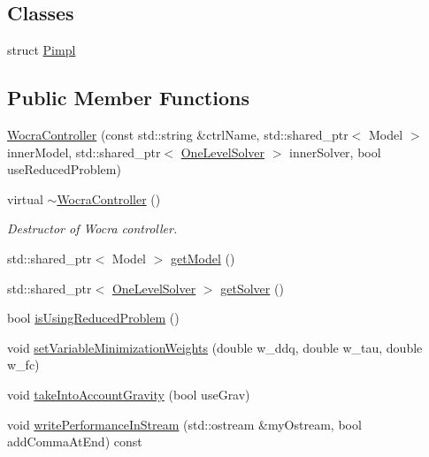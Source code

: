 \subsection*{Classes}
\begin{DoxyCompactItemize}
\item 
struct \hyperlink{structwocra_1_1WocraController_1_1Pimpl}{Pimpl}
\end{DoxyCompactItemize}
\subsection*{Public Member Functions}
\begin{DoxyCompactItemize}
\item 
\hyperlink{classwocra_1_1WocraController_ae14fda387f6d308aead6ab7a59e82e74}{Wocra\+Controller} (const std\+::string \&ctrl\+Name, std\+::shared\+\_\+ptr$<$ Model $>$ inner\+Model, std\+::shared\+\_\+ptr$<$ \hyperlink{classocra_1_1OneLevelSolver}{One\+Level\+Solver} $>$ inner\+Solver, bool use\+Reduced\+Problem)
\item 
virtual \hyperlink{classwocra_1_1WocraController_a4051d9aab485cfa444ed90da795f2bb2}{$\sim$\+Wocra\+Controller} ()
\begin{DoxyCompactList}\small\item\em Destructor of Wocra controller. \end{DoxyCompactList}\item 
std\+::shared\+\_\+ptr$<$ Model $>$ \hyperlink{classwocra_1_1WocraController_adc7f78b5f888c76a3296cfd5882caad1}{get\+Model} ()
\item 
std\+::shared\+\_\+ptr$<$ \hyperlink{classocra_1_1OneLevelSolver}{One\+Level\+Solver} $>$ \hyperlink{classwocra_1_1WocraController_a94f67ee0ae6985969f4f1798bde0a9db}{get\+Solver} ()
\item 
bool \hyperlink{classwocra_1_1WocraController_a89eab1194e0598d8b30730429f286450}{is\+Using\+Reduced\+Problem} ()
\item 
void \hyperlink{classwocra_1_1WocraController_a23b01d7dad39803132d69ae335212615}{set\+Variable\+Minimization\+Weights} (double w\+\_\+ddq, double w\+\_\+tau, double w\+\_\+fc)
\item 
void \hyperlink{classwocra_1_1WocraController_a339cb7de07b9766aba4b3d1cfd6a78d4}{take\+Into\+Account\+Gravity} (bool use\+Grav)
\item 
void \hyperlink{classwocra_1_1WocraController_a9b296a995ba10ef66cc4416f34f4b675}{write\+Performance\+In\+Stream} (std\+::ostream \&my\+Ostream, bool add\+Comma\+At\+End) const

\end{DoxyCompactItemize}
